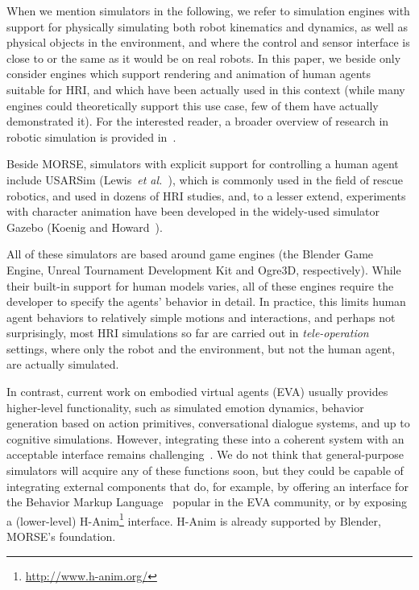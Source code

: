 \documentclass[conference]{IEEEtran}
\newcommand{\etal}{{\textit{et al.~}}}
\begin{document}
When we mention simulators in the following, we refer to simulation engines with
support for physically simulating both robot kinematics and dynamics, as well as
physical objects in the environment, and where the control and sensor interface
is close to or the same as it would be on real robots. In this paper, we beside
only consider engines which support rendering and animation of human agents
suitable for HRI, and which have been actually used in this context (while many
engines could theoretically support this use case, few of them have actually
demonstrated it). For the interested reader, a broader overview of research in
robotic simulation is provided in~\cite{Ando2010}.

Beside MORSE, simulators with explicit support for controlling a human agent
include USARSim (Lewis~\etal\cite{lewis2007usarsim}), which is commonly used in
the field of rescue robotics, and used in dozens of HRI studies, and, to a
lesser extend, experiments with character animation have been developed in the
widely-used simulator Gazebo (Koenig and Howard~\cite{Koenig2004}).


%

All of these simulators are based around game engines (the Blender Game Engine,
Unreal Tournament Development Kit and Ogre3D, respectively). While their
built-in support for human models varies, all of these engines require the
developer to specify the agents' behavior in detail. In practice, this limits
human agent behaviors to relatively simple motions and interactions, and perhaps
not surprisingly, most HRI simulations so far are carried out in
\emph{tele-operation} settings, where only the robot and the environment, but
not the human agent, are actually simulated.

In contrast, current work on embodied virtual agents (EVA) usually provides 
higher-level functionality, such as simulated emotion dynamics, behavior 
generation based on action primitives, conversational dialogue systems, and
up to cognitive simulations. However, integrating these into a coherent 
system with an acceptable interface remains 
challenging~\cite{gratch2002creating}. We do not think that general-purpose
simulators will acquire any of these functions soon, but they could be
capable of integrating external components that do, for example, by offering 
an interface for the Behavior Markup Language~\cite{kopp2006towards} popular
in the EVA community, or by exposing a (lower-level) 
H-Anim\footnote{\url{http://www.h-anim.org/}} interface. H-Anim is already
supported by Blender, MORSE's foundation.
\end{document}
